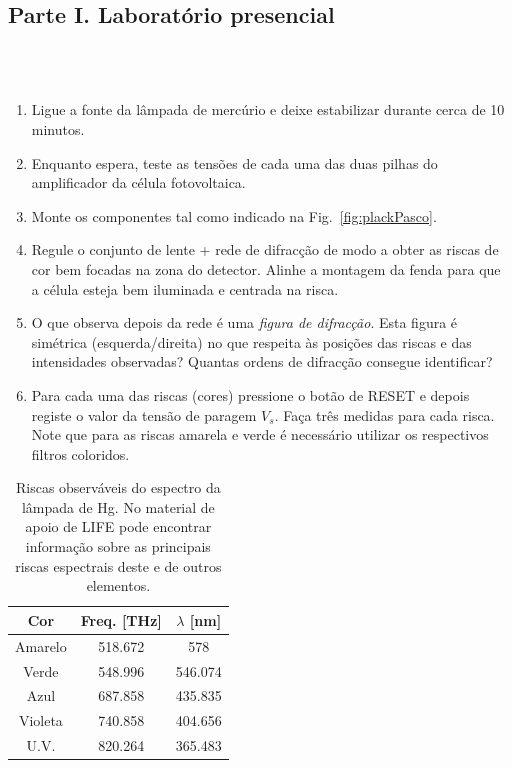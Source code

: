 \documentclass[12pt,a4paper,oneside]{paper}
\begin{document}
\subsection*{\sf Parte I. Laboratório presencial}
\\ \\


\begin{enumerate}
\item Ligue a fonte da lâmpada de mercúrio e deixe estabilizar durante cerca de 10 minutos.
\item Enquanto espera, teste as tensões de cada uma das duas pilhas do amplificador da célula fotovoltaica.
\item Monte os componentes tal como indicado na Fig.~\ref{fig:plackPasco}.
\item Regule o conjunto de lente + rede de difracção de modo a obter as riscas de cor bem focadas na zona do detector.
Alinhe a montagem da fenda para que a célula esteja bem iluminada e centrada na risca.
\item O que observa depois da rede é uma \emph{figura de difracção}. 
Esta figura é simétrica (esquerda/direita) no que respeita às posições das riscas e das intensidades observadas? Quantas
ordens de difracção consegue identificar?
\item Para cada uma das riscas (cores) pressione o botão de RESET e depois registe o valor da tensão de paragem $V_s$. Faça
três medidas para cada risca. Note que para as riscas amarela e verde é necessário utilizar os respectivos filtros coloridos.
\end{enumerate}

\begin{table}[!hbp]
\begin{center}
	\begin{tabular}{|c|c|c|}
	\hline
	Cor  & Freq. [THz] & $\lambda$ [nm]  \\
	\hline
	Amarelo & 518.672 & 578 \\
	Verde & 548.996 & 546.074\\
	Azul & 687.858  & 435.835 \\
	Violeta & 740.858  & 404.656\\
	U.V.    & 820.264  & 365.483 \\
	\hline
 	\end{tabular}
	\caption{Riscas observáveis do espectro da lâmpada de Hg. No material de apoio de LIFE pode encontrar informação sobre
	as principais riscas espectrais deste e de outros elementos.} 
	\label{tab:Hg}
	\end{center}
\end{table}
\end{document}
